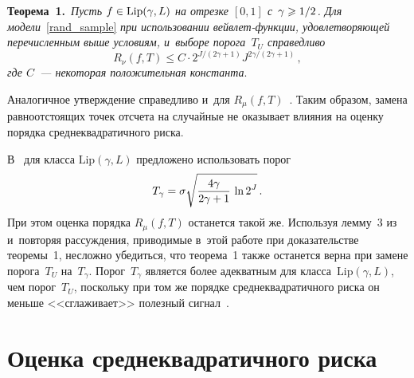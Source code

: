 \begin{multicols}{2}
\smallskip

\noindent
\textbf{Теорема~1.}\ 
\textit{Пусть $f\hm\in\mathrm{Lip}(\gamma,L)$ на отрезке $[0,1]$ с~$\gamma\hm\geqslant1/2$. 
Для модели}~\eqref{rand_sample} \textit{при использовании вейв\-лет-функ\-ции, 
удовлетворяющей перечисленным выше условиям, и~выборе порога~$T_U$ справедливо}
\begin{equation*}%
R_{\nu}(f,T)\leqslant C\cdot 2^{{J}/({2\gamma+1})} J^{{2\gamma}/({2\gamma+1})}\,, %
\end{equation*}
\textit{где $C$~--- некоторая положительная константа}.

Аналогичное утверждение справедливо и~для $R_{\mu}(f,T)$~\cite{DonJ95}. 
Таким образом, замена равноотстоящих точек отсчета на случайные не оказывает 
влияния на оценку порядка среднеквадратичного риска.

В~\cite{Jan01} для класса $\mathrm{Lip}(\gamma,L)$ предложено использовать 
порог 
$$
T_\gamma\hm=\sigma\sqrt{\fr{4\gamma}{2\gamma+1}\,\ln 2^J}\,.
$$
 При этом оценка порядка $R_{\mu}(f,T)$ останется такой же. Используя лемму~3 
 из~\cite{CB99} и~повторяя рас\-суж\-де\-ния, приводимые в~этой работе при доказательстве 
 теоремы~1, несложно убедиться, что теорема~1 также останется верна при замене 
 порога~$T_U$ на~$T_\gamma$. Порог~$T_\gamma$ является более адекватным для 
 класса~$\mathrm{Lip}(\gamma,L)$, чем порог~$T_U$, поскольку при том же порядке 
 среднеквадратичного риска он меньше <<сглаживает>> полезный сигнал~\cite{Jan01}.


\section{Оценка среднеквадратичного риска}


\end{multicols}
